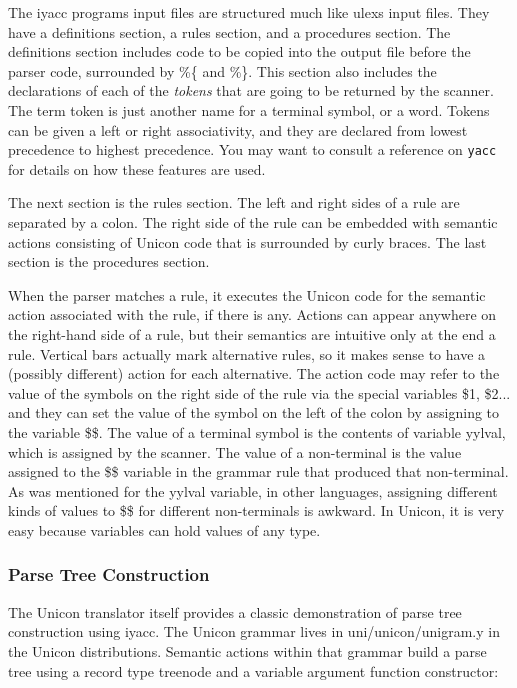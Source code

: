 \bigskip

The \textsf{iyacc} program{\textquotesingle}s input files are structured
much like \textsf{ulex}{\textquotesingle}s input files. They have a
definitions section, a rules section, and a procedures section. The
definitions section includes code to be copied into the output file
before the parser code, surrounded by \textsf{\%\{} and \textsf{\%\}}.
This section also includes the declarations of each of the
\textit{tokens} that are going to be returned by the scanner. The term
{\textquotedbl}token{\textquotedbl} is just another name for a terminal
symbol, or a word. Tokens can be given a left or right associativity,
and they are declared from lowest precedence to highest precedence. You
may want to consult a reference on \texttt{yacc} for details on how
these features are used.

The next section is the rules section. The left and right sides of a
rule are separated by a colon. The right side of the rule can be
embedded with semantic actions consisting of Unicon code that is
surrounded by curly braces. The last section is the procedures section.

When the parser matches a rule, it executes the Unicon code for the
semantic action associated with the rule, if there is any. Actions can
appear anywhere on the right-hand side of a rule, but their semantics
are intuitive only at the end a rule. Vertical bars actually mark
alternative rules, so it makes sense to have a (possibly different)
action for each alternative. The action code may refer to the value of
the symbols on the right side of the rule via the special variables
\textsf{\$1}, \textsf{\$2}... and they can set the value of the symbol
on the left of the colon by assigning to the variable \textsf{\$\$}.
The value of a terminal symbol is the contents of variable
\textsf{yylval}, which is assigned by the scanner. The value of a
non-terminal is the value assigned to the \textsf{\$\$} variable in the
grammar rule that produced that non-terminal. As was mentioned for the
\textsf{yylval} variable, in other languages, assigning different kinds
of values to \textsf{\$\$} for different non-terminals is awkward. In
Unicon, it is very easy because variables can hold values of any type.

\subsubsection{Parse Tree Construction}

The Unicon translator itself provides a classic demonstration of parse
tree construction using \textsf{iyacc}. The Unicon grammar lives in
\textsf{uni/unicon/unigram.y} in the Unicon distributions. Semantic
actions within that grammar build a parse tree using a record type
\textsf{treenode} and a variable argument function constructor:

